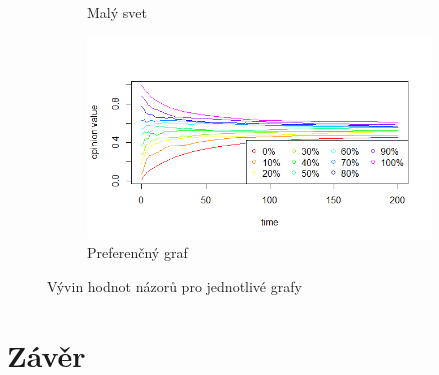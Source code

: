 \documentclass[10pt,a4paper]{report}
\begin{document}
\begin{figure}[h]
\begin{subfigure}[b]{0.475\textwidth}
      \caption[]%
      {{\small Malý svet}}    
      \label{fig:prubeh-maly svet}
  \end{subfigure}
  \quad
  \begin{subfigure}[b]{0.475\textwidth}   
      \centering 
      \includegraphics[width=\textwidth]{plots/max-values/prefferentialMaxV.png}
      \caption[]%
      {{\small Preferenčný graf}}    
      \label{fig:prubeh-preferencni}
  \end{subfigure}
  \caption[]
  {\small Vývin hodnot názorů pro jednotlivé grafy}
  \label{fig:prubeh-grafy}
\end{figure}
 
\chapter{Závěr}
\end{document}

